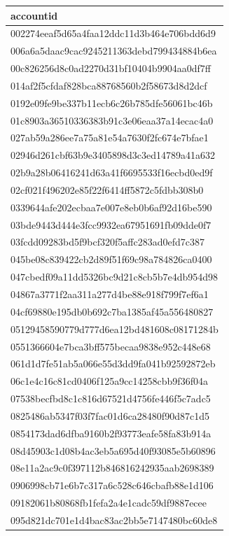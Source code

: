 \begin{tabular}{l}
\toprule
accountid \\
\midrule
002274eeaf5d65a4faa12ddc11d3b464e706bdd6d9 \\
006a6a5daac9cac9245211363debd799434884b6ea \\
00c826256d8c0ad2270d31bf10404b9904aa0df7ff \\
014af2f5cfdaf828bca88768560b2f58673d8d2dcf \\
0192e09fe9be337b11ecb6c26b785dfe56061bc46b \\
01c8903a36510336383b91c3e06eaa37a14ecac4a0 \\
027ab59a286ee7a75a81e54a7630f2fc674e7bfae1 \\
02946d261cbf63b9e3405898d3c3ed14789a41a632 \\
02b9a28b06416241d63a41f6695533f16ecbd0ed9f \\
02cf021f496202e85f22f6414ff5872c5fdbb308b0 \\
0339644afe202ecbaa7e007e8eb0b6af92d16be590 \\
03bde9443d444e3fcc9932ea67951691fb09dde0f7 \\
03fcdd09283bd5f9bcf320f5affc283ad0efd7c387 \\
045be08c839422cb2d89f51f69c98a784826ca0400 \\
047cbedf09a11dd5326bc9d21c8cb5b7e4db954d98 \\
04867a3771f2aa311a277d4be88e918f799f7ef6a1 \\
04cf69880e195db0b692c7ba1385af45a556480827 \\
05129458590779d777d6ea12bd481608c08171284b \\
0551366604e7bca3bff575becaa9838e952c448e68 \\
061d1d7fe51ab5a066e55d3dd9fa041b92592872eb \\
06c1e4c16c81cd0406f125a9cc14258cbb9f36f04a \\
07538becfbd8c1c816d67521d4756fe446f5c7adc5 \\
0825486ab5347f03f7fac01d6ca28480f90d87c1d5 \\
0854173dad6dfba9160b2f93773eafe58fa83b914a \\
08d45903c1d08b4ac3eb5a695d40f93085e5b60896 \\
08e11a2ac9c0f397112b846816242935aab2698389 \\
0906998cb71e6b7c317a6c528c646cbafb88e1d106 \\
09182061b80868fb1fefa2a4e1cadc59df9887ecee \\
095d821dc701e1d4bac83ac2bb5e7147480bc60de8 \\

\end{tabular}
